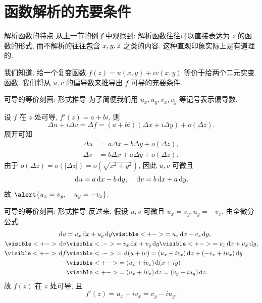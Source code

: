 \section{函数解析的充要条件}


\begin{frame}{解析函数的特点}
\onslide<+->
从上一节的例子中观察到:
\onslide<+->
解析函数往往可以直接表达为 $z$ 的函数的形式, 而不解析的往往包含 $x,y,\overline z$ 之类的内容.
\onslide<+->
这种直观印象实际上是有道理的.

\onslide<+->
我们知道, 给一个复变函数 $f(z)=u(x,y)+iv(x,y)$ 等价于给两个二元实变函数.
\onslide<+->
我们将从 $u,v$ 的偏导数来推导出 $f$ 可导的充要条件.
\end{frame}


\begin{frame}{可导的等价刻画: 形式推导}
\onslide<+->
为了简便我们用 $u_x,u_y,v_x,v_y$ 等记号表示偏导数.

\onslide<+->
设 $f$ 在 $z$ 处可导, $f'(z)=a+bi$,
\onslide<+->
则
\[\Delta u+i\Delta v=\Delta f=(a+bi)(\Delta x+i\Delta y)+o(\Delta z).\]
\onslide<+->
展开可知
\begin{align*}
\Delta u&=a\Delta x-b\Delta y+o(\Delta z),\\
\Delta v&=b\Delta x+a\Delta y+o(\Delta z).
\end{align*}
\onslide<+->
由于 $o(\Delta z)=o(|\Delta z|)=o(\sqrt{x^2+y^2})$, 因此 \alert{$u,v$ 可微}且
\[\,\mathrm{d} u=a\,\mathrm{d} x-b\,\mathrm{d} y,\quad
\,\mathrm{d} v=b\,\mathrm{d} x+a\,\mathrm{d} y.\]
\onslide<+->
故 $\alert{u_x=v_y,\quad u_y=-v_x}$.
\end{frame}


\begin{frame}{可导的等价刻画: 形式推导}
\onslide<+->
反过来, 假设 $u,v$ 可微且 $u_x=v_y, u_y=-v_x$.
\onslide<+->
由全微分公式
\begin{align*}
\diff u&=u_x\diff x+u_y\diff y
\visible<+->{=u_x\diff x-v_x\diff y,}\\
\visible<+->{\diff v}&\visible<.->{=v_x\diff x+v_y\diff y}\visible<+->{=v_x\diff x+u_x\diff y,}\\
\visible<+->{\diff f}&
\visible<.->{=\diff (u+iv)=(u_x+i v_x)\diff x+(-v_x+i u_x)\diff y}\\
&\visible<+->{=(u_x+i v_x)\diff(x+iy)}\\
&\visible<+->{=(u_x+i v_x)\diff z=(v_y-i u_y)\diff z.}
\end{align*}
\onslide<+->
故 $f(z)$ 在 $z$ 处可导, 且
\[f'(z)=u_x+i v_x=v_y-i u_y.\]
\end{frame}


